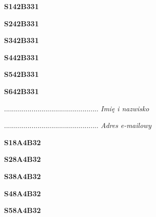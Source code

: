 \begin{turn}{90}\huge \textbf{S142B331}\end{turn}

\begin{turn}{90}\huge \textbf{S242B331}\end{turn}

\begin{turn}{90}\huge \textbf{S342B331}\end{turn}

\begin{turn}{90}\huge \textbf{S442B331}\end{turn}

\begin{turn}{90}\huge \textbf{S542B331}\end{turn}

\begin{turn}{90}\huge \textbf{S642B331}\end{turn}

\begin{turn}{90}\begin{minipage}{\linewidth} \vspace{20mm} ................................................  \textit{Imię i nazwisko}\end{minipage}\end{turn}

\begin{turn}{90}\begin{minipage}{\linewidth} \vspace{20mm} ................................................  \textit{Adres e-mailowy}\end{minipage}\end{turn}

\begin{turn}{90}\huge \textbf{S18A4B32}\end{turn}

\begin{turn}{90}\huge \textbf{S28A4B32}\end{turn}

\begin{turn}{90}\huge \textbf{S38A4B32}\end{turn}

\begin{turn}{90}\huge \textbf{S48A4B32}\end{turn}

\begin{turn}{90}\huge \textbf{S58A4B32}\end{turn}

